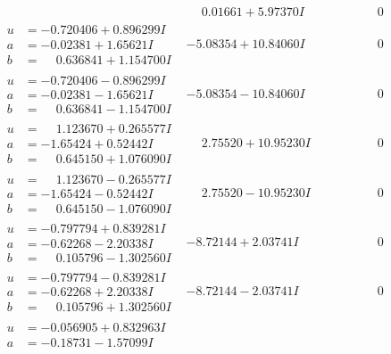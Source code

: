 \documentclass[1p]{elsarticle_modified}
\theoremstyle{definition}
\begin{document}
$$\begin{array}{c|c|c}
 & \phantom{-}0.01661 + 5.97370 I & \phantom{-0.000000 } 0 \\ \hline\begin{aligned}
u &= -0.720406 + 0.896299 I \\
a &= -0.02381 + 1.65621 I \\
b &= \phantom{-}0.636841 + 1.154700 I\end{aligned}
 & -5.08354 + 10.84060 I & \phantom{-0.000000 } 0 \\ \hline\begin{aligned}
u &= -0.720406 - 0.896299 I \\
a &= -0.02381 - 1.65621 I \\
b &= \phantom{-}0.636841 - 1.154700 I\end{aligned}
 & -5.08354 - 10.84060 I & \phantom{-0.000000 } 0 \\ \hline\begin{aligned}
u &= \phantom{-}1.123670 + 0.265577 I \\
a &= -1.65424 + 0.52442 I \\
b &= \phantom{-}0.645150 + 1.076090 I\end{aligned}
 & \phantom{-}2.75520 + 10.95230 I & \phantom{-0.000000 } 0 \\ \hline\begin{aligned}
u &= \phantom{-}1.123670 - 0.265577 I \\
a &= -1.65424 - 0.52442 I \\
b &= \phantom{-}0.645150 - 1.076090 I\end{aligned}
 & \phantom{-}2.75520 - 10.95230 I & \phantom{-0.000000 } 0 \\ \hline\begin{aligned}
u &= -0.797794 + 0.839281 I \\
a &= -0.62268 - 2.20338 I \\
b &= \phantom{-}0.105796 - 1.302560 I\end{aligned}
 & -8.72144 + 2.03741 I & \phantom{-0.000000 } 0 \\ \hline\begin{aligned}
u &= -0.797794 - 0.839281 I \\
a &= -0.62268 + 2.20338 I \\
b &= \phantom{-}0.105796 + 1.302560 I\end{aligned}
 & -8.72144 - 2.03741 I & \phantom{-0.000000 } 0 \\ \hline\begin{aligned}
u &= -0.056905 + 0.832963 I \\
a &= -0.18731 - 1.57099 I \\

\end{aligned}
\end{array}$$
\end{document}
